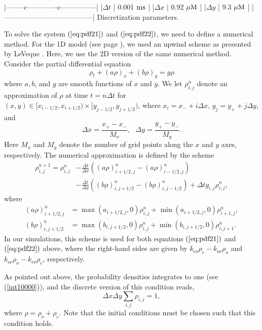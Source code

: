 |--------c-------------c---------------|
|$\Delta t $ | 0.001 $\rm{ms}$         |
|$\Delta x $ | 0.92 $\rm{\mu M}$       |
|$\Delta y $ | 9.3 $\rm{\mu M}$        |
|--------------------------------------|
Discretization parameters.

To solve the system $(\ref{eq:pdf21})$ and $(\ref{eq:pdf22})$, we need to
define a numerical method. For the 1D model (see page \pageref{npdf}), we used
an upwind scheme as presented by LeVeque \cite{LeVeque2002}. Here,
we use the 2D version of the same numerical method. Consider the partial
differential equation
\[
\rho_{t}+(a\rho)_{x}+\left(  b\rho\right)  _{y}=g\rho
\]
where $a,b$, and $g$ are smooth functions of $x$ and $y.$ We let $\rho
_{i,j}^{n}$ denote an approximation of $\rho$ at time $t=n\Delta t$ for
$(x,y)\in\lbrack x_{i-1/2},x_{i+1/2})\times\lbrack y_{j-1/2},y_{j+1/2})$, where
$x_{i}=x_{-}+i\Delta x,\, y_{j}=y_{+}+j\Delta y$, and
\[
\Delta x=\frac{x_{+}-x_{-}}{M_{x}},\text{ }\Delta y=\frac{y_{+}-y_{-}}{M_{y}}.
\]
Here $M_{x}$ and $M_{y}$ denote the number of grid points along the $x$ and $y$
axes, respectively. The numerical approximation is defined by the scheme
\begin{align}
\rho_{i,j}^{n+1}=\rho_{i,j}^{n} &  -\frac{\Delta t}{\Delta x}\left(  \left(
a\rho\right)  _{i+1/2,j}^{n}-\left(  a\rho\right)  _{i-1/2,j}^{n}\right)
\nonumber\\
&  -\frac{\Delta t}{\Delta y}\left(  \left(  b\rho\right)  _{i,j+1/2}
^{n}-\left(  b\rho\right)  _{i,j-1/2}^{n}\right)  +\Delta tg_{i,j}\rho
_{i,j}^{n}, \label{eq:scheme2D}
\end{align}
where
\begin{align}
\left(  a\rho\right)  _{i+1/2,j}^{n} &  =\max(a_{i+1/2,j},0)\rho_{i,j}
^{n}+\min(a_{i+1/2,j},0)\rho_{i+1,j}^{n},\label{eq:flux_x}\\
\left(  b\rho\right)  _{i,j+1/2}^{n} &  =\max(b_{i,j+1/2},0)\rho_{i,j}
^{n}+\min(b_{i,j+1/2},0)\rho_{i,j+1}^{n}.\label{eq:flux_y}
\end{align}
In our simulations, this scheme is used for both equations $(\ref{eq:pdf21})$
and $(\ref{eq:pdf22})$ above, where the right-hand sides are given by
$k_{co}\rho_{c}-k_{oc}\rho_{o}$ and $k_{oc}\rho_{o}-k_{co}\rho_{c}$,
respectively. 

As pointed out above, the probability densities integrates to one (see (\ref{int10000})), and the discrete version of this condition
reads,
\begin{equation}
\Delta x \Delta y \sum_{i,j}  \rho_{i,j}=1,  \label{discrete_sumone}
\end{equation}
where $\rho=\rho_{o}+\rho_{c}$.  Note that the initial conditions must be chosen such that this condition holds.



